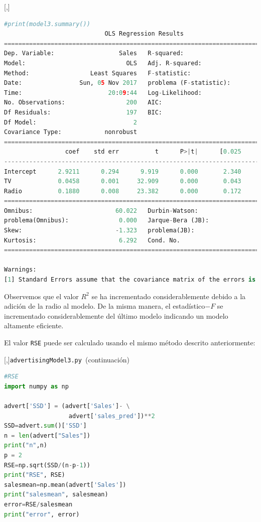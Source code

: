 [,]{}
\begin{lstlisting}[language=Python]
#print(model3.summary())
                            OLS Regression Results
==============================================================================
Dep. Variable:                  Sales   R-squared:                       0.897
Model:                            OLS   Adj. R-squared:                  0.896
Method:                 Least Squares   F-statistic:                     859.6
Date:                Sun, 05 Nov 2017   problema (F-statistic):           4.83e-98
Time:                        20:09:44   Log-Likelihood:                -386.20
No. Observations:                 200   AIC:                             778.4
Df Residuals:                     197   BIC:                             788.3
Df Model:                           2
Covariance Type:            nonrobust
==============================================================================
                 coef    std err          t      P>|t|      [0.025      0.975]
------------------------------------------------------------------------------
Intercept      2.9211      0.294      9.919      0.000       2.340       3.502
TV             0.0458      0.001     32.909      0.000       0.043       0.048
Radio          0.1880      0.008     23.382      0.000       0.172       0.204
==============================================================================
Omnibus:                       60.022   Durbin-Watson:                   2.081
problema(Omnibus):              0.000   Jarque-Bera (JB):              148.679
Skew:                          -1.323   problema(JB):                     5.19e-33
Kurtosis:                       6.292   Cond. No.                         425.
==============================================================================

Warnings:
[1] Standard Errors assume that the covariance matrix of the errors is correctly specified.
\end{lstlisting}


Observemos que el valor $R^{2}$ se ha incrementado considerablemente debido a la adición de la radio al modelo. De la misma manera, el estadístico$-F$ se incrementado considerablemente del último modelo indicando un modelo altamente eficiente.


El valor \texttt{RSE} puede ser calculado usando el mismo método descrito anteriormente:

[,]{\texttt{advertisingModel3.py }(continuación)} 
\begin{lstlisting}[language=Python]
#RSE
import numpy as np

advert['SSD'] = (advert['Sales']- \
                  advert['sales_pred'])**2
SSD=advert.sum()['SSD']
n = len(advert["Sales"])
print("n",n)
p = 2
RSE=np.sqrt(SSD/(n-p-1))
print("RSE", RSE)
salesmean=np.mean(advert['Sales'])
print("salesmean", salesmean)
error=RSE/salesmean
print("error", error)
\end{lstlisting}


